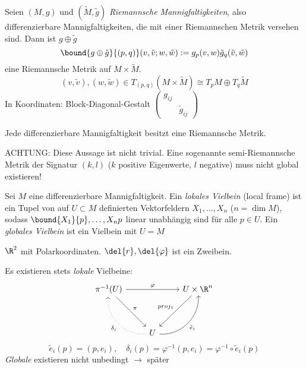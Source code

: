 \begin{defn}
	Seien $ (M,g) $ und $ (\tilde{M},\tilde{g}) $ \emph{Riemannsche Mannigfaltigkeiten}, also differenzierbare Mannigfaltigkeiten, die mit einer Riemannschen Metrik versehen sind. Dann ist $g \oplus \tilde{g}$
	\[ \bound{g \oplus \tilde{g}}{(p,q)}(v,\tilde{v};w,\tilde{w}) := g_p(v,w) \tilde{g}_q(\tilde{v},\tilde{w}) \]
	eine Riemannsche Metrik auf $M \times \tilde{M}$.
	\[ (v,\tilde{v}),(w,\tilde{w}) \in T_{(p,q)}(M \times \tilde{M}) \cong T_pM \oplus T_q\tilde{M} \]
	In Koordinaten: Block-Diagonal-Gestalt $ \begin{pmatrix}
		g_{ij} & \\ & \tilde{g}_{ij}
	\end{pmatrix} $
\end{defn}

\begin{thm}
	Jede differenzierbare Mannigfaltigkeit besitzt eine Riemannsche Metrik.
\end{thm}

\begin{rem*}
	ACHTUNG: Diese Aussage ist nicht trivial. Eine sogenannte semi-Riemannsche Metrik der Signatur $(k,l)$ ($k$ positive Eigenwerte, $l$ negative) muss nicht global existieren!
\end{rem*}

\begin{defn*}
	Sei $M$ eine differenzierbare Mannigfaltigkeit. Ein \emph{lokales Vielbein} (local frame) ist ein Tupel von auf $U \subset M$ definierten Vektorfeldern $ X_1,\dotsc,X_n $ ($n = \dim M$), sodass $ \bound{X_1}{p}, \dotsc, {X_n}{p} $ linear unabhängig sind für alle $p \in U$. Ein \emph{globales Vielbein} ist ein Vielbein mit $U = M$
\end{defn*}

\begin{exmp*}
	$\R^2$ mit Polarkoordinaten. $ \del{r},\del{\varphi} $ ist ein Zweibein.
\end{exmp*}

\begin{rem}\label{6.4}
	Es existieren stets \emph{lokale} Vielbeine:
	\[ \begin{tikzcd}
		\pi^{-1}(U) \arrow{rr}{\varphi} \arrow{ddr}{\pi} & & U \times \R^n \arrow{ddl}[swap]{proj_1}\\
		&&\\
		& U \arrow[bend left = 50, dotted]{luu}{\delta_i} \arrow[bend right=50]{uur}[swap]{\tilde{e}_i} &
	\end{tikzcd} \]
	\[ \tilde{e}_i(p) = (p,e_i),\quad \delta_i(p) = \varphi^{-1} (p,e_i) = \varphi^{-1} \circ \tilde{e}_i(p) \]
	\emph{Globale} existieren nicht unbedingt $\rightarrow$ später
\end{rem}

